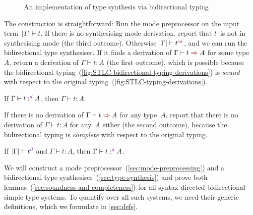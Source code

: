 \begin{figure}
  \small
  \caption{An implementation of type synthesis via bidirectional typing}
\end{figure}

The construction is straightforward:
Run the mode preprocessor on the input term~$|\Gamma| \vdash t$.
If there is no synthesising mode derivation, report that $t$~is not in synthesising mode (the third outcome).
Otherwise $|\Gamma| \vdash t^{\syn}$, and we can run the bidirectional type synthesiser.
If it finds a derivation of $\Gamma \vdash t \syn A$ for some type~$A$, return a derivation of $\Gamma \vdash t : A$ (the first outcome), which is possible because the bidirectional typing~(\cref{fig:STLC-bidirectional-typing-derivations}) is \emph{sound}%
with respect to the original typing~(\cref{fig:STLC-typing-derivations}).

\begin{lemma}[Soundness]
If\/ $\Gamma \vdash t :^\dir{d} A$, then $\Gamma \vdash t : A$.
\end{lemma}

If there is no derivation of $\Gamma \vdash t \syn A$ for any type~$A$, report that there is no derivation of $\Gamma \vdash t : A$ for any~$A$ either (the second outcome), because the bidirectional typing is \emph{complete} with respect to the original typing.

\begin{lemma}[Completeness]
If\/ $|\Gamma| \vdash t^\dir{d}$ and\/ $\Gamma \vdash t : A$, then $\Gamma \vdash t :^\dir{d} A$.
\end{lemma}

We will construct a mode preprocessor~(\cref{sec:mode-preprocessing}) and a bidirectional type synthesiser~(\cref{sec:type-synthesis}) and prove both lemmas~(\cref{sec:soundness-and-completeness}) for all syntax-directed bidirectional simple type systems.
To quantify over all such systems, we need their generic definitions, which we formulate in \cref{sec:defs}.


